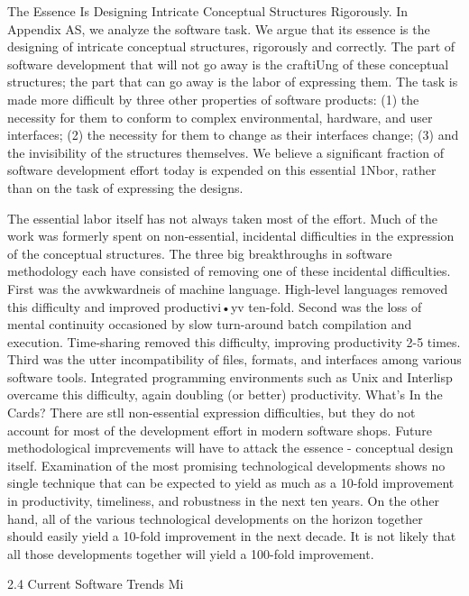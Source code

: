 \documentclass[12pt]{article}
\begin{document}
The Essence Is Designing Intricate Conceptual Structures Rigorously.
In Appendix AS, we analyze the software task. We argue that its essence is the
designing of intricate conceptual structures, rigorously and correctly. The part of software
development that will not go away is the craftiUng of these conceptual structures; the part
that can go away is the labor of expressing them. The task is made more difficult by three
other properties of software products: (1) the necessity for them to conform to complex
environmental, hardware, and user interfaces; (2) the necessity for them to change as their
interfaces change; (3) and the invisibility of the structures themselves.
We believe a significant fraction of software development effort today is expended on
this essential 1Nbor, rather than on the task of expressing the designs.

The essential labor itself has not always taken most of the effort. Much of the work was
formerly spent on non-essential, incidental difficulties in the expression of the conceptual
structures. The three big breakthroughs in software methodology each have consisted of
removing one of these incidental difficulties.
First was the avwkwardneis of machine language. High-level languages removed this
difficulty and improved productivi•yv ten-fold.
Second was the loss of mental continuity occasioned by slow turn-around batch
compilation and execution. Time-sharing removed this difficulty, improving productivity
2-5 times.
Third was the utter incompatibility of files, formats, and interfaces among various
software tools. Integrated programming environments such as Unix and Interlisp overcame
this difficulty, again doubling (or better) productivity.
What's In the Cards?
There are stll non-essential expression difficulties, but they do not account for most
of the development effort in modern software shops. Future methodological imprcvements
will have to attack the essence - conceptual design itself.
Examination of the most promising technological developments shows no single technique that can be expected to yield as much as a 10-fold improvement in productivity,
timeliness, and robustness in the next ten years.
On the other hand, all of the various technological developments on the horizon
together should easily yield a 10-fold improvement in the next decade. It is not likely
that all those developments together will yield a 100-fold improvement.

2.4 Current Software Trends
Mi
\end{document}
